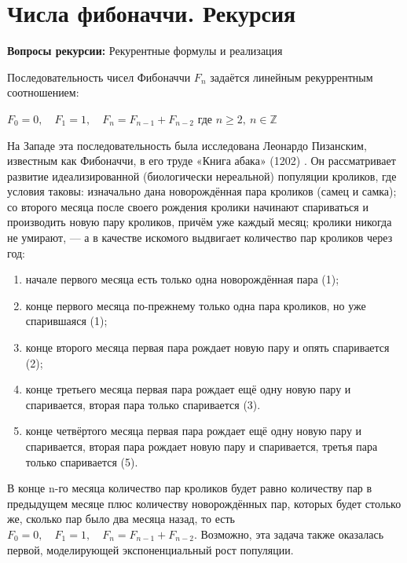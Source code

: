 \documentclass[12pt, leqno]{article}
\begin{document}
\section*{Числа фибоначчи. Рекурсия}
\begin{flushleft}
\textbf{Вопросы рекурсии:} Рекурентные формулы и реализация
\end{flushleft}

Последовательность чисел Фибоначчи  $ F_{n} $ задаётся линейным рекуррентным соотношением: 

$ F_{0}=0,\quad F_{1}=1,\quad F_{n}=F_{n-1}+F_{n-2} $ где $ n \geqslant 2,\ n\in \mathbb {Z}$ 
 

На Западе эта последовательность была исследована Леонардо Пизанским, известным как Фибоначчи, в его труде «Книга абака» (1202) . Он рассматривает развитие идеализированной (биологически нереальной) популяции кроликов, где условия таковы: изначально дана новорождённая пара кроликов (самец и самка); со второго месяца после своего рождения кролики начинают спариваться и производить новую пару кроликов, причём уже каждый месяц; кролики никогда не умирают, — а в качестве искомого выдвигает количество пар кроликов через год:

\begin{enumerate}
    \item начале первого месяца есть только одна новорождённая пара (1);\\
    \item конце первого месяца по-прежнему только одна пара кроликов, но уже спарившаяся (1);\\
    \item конце второго месяца первая пара рождает новую пару и опять спаривается (2);\\
    \item конце третьего месяца первая пара рождает ещё одну новую пару и спаривается, вторая пара только спаривается (3).\\
    \item конце четвёртого месяца первая пара рождает ещё одну новую пару и спаривается, вторая пара рождает новую пару и спаривается, третья пара только спаривается (5).\\
\end{enumerate}

В конце n-го месяца количество пар кроликов будет равно количеству пар в предыдущем месяце плюс количеству новорождённых пар, которых будет столько же, сколько пар было два месяца назад, то есть $ F_{0}=0,\quad F_{1}=1,\quad F_{n}=F_{n-1}+F_{n-2} $. Возможно, эта задача также оказалась первой, моделирующей экспоненциальный рост популяции. 
 
\end{document}
